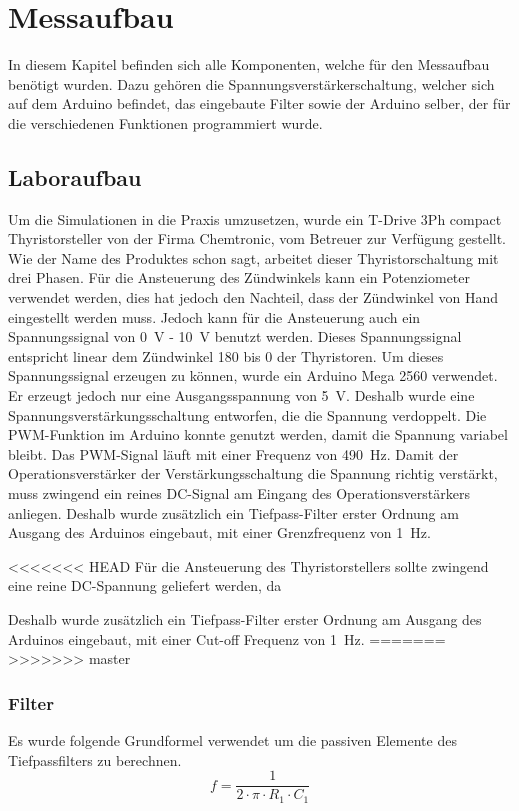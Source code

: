 \section{Messaufbau}
In diesem Kapitel befinden sich alle Komponenten, welche für den Messaufbau benötigt wurden. Dazu gehören die Spannungsverstärkerschaltung, welcher sich auf dem Arduino befindet, das eingebaute Filter sowie der Arduino selber, der für die verschiedenen Funktionen programmiert wurde.
\subsection{Laboraufbau}
Um die Simulationen in die Praxis umzusetzen, wurde ein \grqq T-Drive 3Ph compact Thyristorsteller\grqq \hspace{0.03cm} von der Firma Chemtronic, vom Betreuer zur Verfügung gestellt. Wie der Name des Produktes schon sagt, arbeitet dieser Thyristorschaltung mit drei Phasen. Für die Ansteuerung des Zündwinkels kann ein Potenziometer verwendet werden, dies hat jedoch den Nachteil, dass der Zündwinkel von Hand eingestellt werden muss. Jedoch kann für die Ansteuerung auch ein Spannungssignal von \SI{0}{V} - \SI{10}{V} benutzt werden. Dieses Spannungssignal entspricht linear dem Zündwinkel 180\textdegree \hspace{0.02cm} bis 0\textdegree \hspace{0.02cm} der Thyristoren. Um dieses Spannungssignal erzeugen zu können, wurde ein Arduino Mega 2560 verwendet. Er erzeugt jedoch nur eine Ausgangsspannung von \SI{5}{V}. Deshalb wurde eine Spannungsverstärkungsschaltung entworfen, die die Spannung verdoppelt. Die PWM-Funktion im Arduino konnte genutzt werden, damit die Spannung variabel bleibt. Das PWM-Signal läuft mit einer Frequenz von \SI{490}{Hz}. 
Damit der Operationsverstärker der Verstärkungsschaltung die Spannung richtig verstärkt, muss zwingend ein reines DC-Signal am Eingang des Operationsverstärkers anliegen. Deshalb wurde zusätzlich ein Tiefpass-Filter erster Ordnung am Ausgang des Arduinos eingebaut, mit einer Grenzfrequenz von \SI{1}{Hz}.  

<<<<<<< HEAD
Für die Ansteuerung des Thyristorstellers sollte zwingend eine reine DC-Spannung geliefert werden, da

Deshalb wurde zusätzlich ein Tiefpass-Filter erster Ordnung am Ausgang des Arduinos eingebaut, mit einer Cut-off Frequenz von \SI{1}{Hz}.  
=======
>>>>>>> master

\subsubsection{Filter}
Es wurde folgende Grundformel verwendet um die passiven Elemente des Tiefpassfilters zu berechnen.
\begin{equation}
f = \frac{1}{2 \cdot \pi \cdot R_1 \cdot C_1}
\end{equation}


